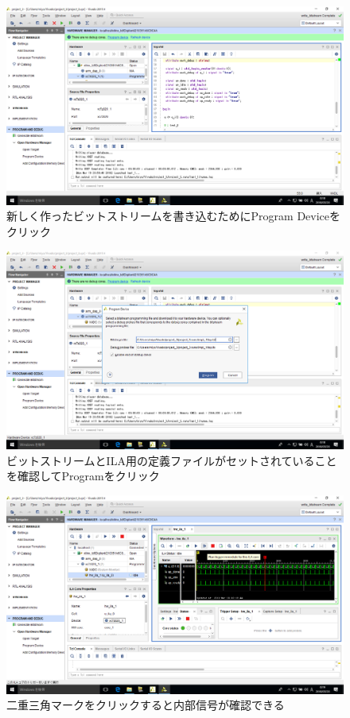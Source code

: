 \documentclass[a4paper,dvipdfmx]{jsarticle}
\begin{document}
 \begin{figure}[H]
  \begin{center}
   \includegraphics[width=.8\textwidth]{chapter08_figures/VirtualBox_Windows10_20_03_2018_00_20_15.png}
  \end{center}
  \caption{新しく作ったビットストリームを書き込むためにProgram Deviceをクリック}
 \end{figure}

 \begin{figure}[H]
  \begin{center}
   \includegraphics[width=.8\textwidth]{chapter08_figures/VirtualBox_Windows10_20_03_2018_00_20_20.png}
  \end{center}
  \caption{ビットストリームとILA用の定義ファイルがセットされていることを確認してProgramをクリック}
 \end{figure}

 \begin{figure}[H]
  \begin{center}
   \includegraphics[width=.8\textwidth]{chapter08_figures/VirtualBox_Windows10_20_03_2018_00_20_58.png}
  \end{center}
  \caption{二重三角マークをクリックすると内部信号が確認できる}
 \end{figure}
\end{document}
